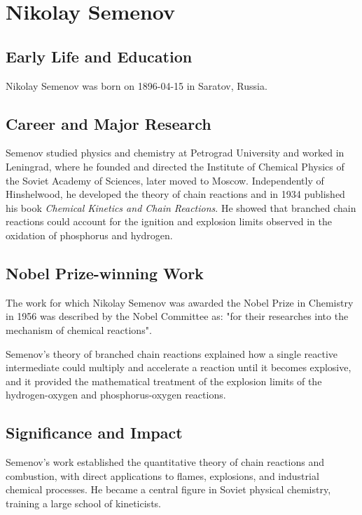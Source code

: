 \clearpage

\section{Nikolay Semenov}

\subsection*{Early Life and Education}

Nikolay Semenov was born on 1896-04-15 in Saratov, Russia.

\subsection*{Career and Major Research}

Semenov studied physics and chemistry at Petrograd University and worked in Leningrad, where he founded and directed the Institute of Chemical Physics of the Soviet Academy of Sciences, later moved to Moscow. Independently of Hinshelwood, he developed the theory of chain reactions and in 1934 published his book \emph{Chemical Kinetics and Chain Reactions}. He showed that branched chain reactions could account for the ignition and explosion limits observed in the oxidation of phosphorus and hydrogen.

\subsection*{Nobel Prize-winning Work}

The work for which Nikolay Semenov was awarded the Nobel Prize in Chemistry in 1956 was described by the Nobel Committee as: "for their researches into the mechanism of chemical reactions".

Semenov's theory of branched chain reactions explained how a single reactive intermediate could multiply and accelerate a reaction until it becomes explosive, and it provided the mathematical treatment of the explosion limits of the hydrogen-oxygen and phosphorus-oxygen reactions.

\subsection*{Significance and Impact}

Semenov's work established the quantitative theory of chain reactions and combustion, with direct applications to flames, explosions, and industrial chemical processes. He became a central figure in Soviet physical chemistry, training a large school of kineticists.

